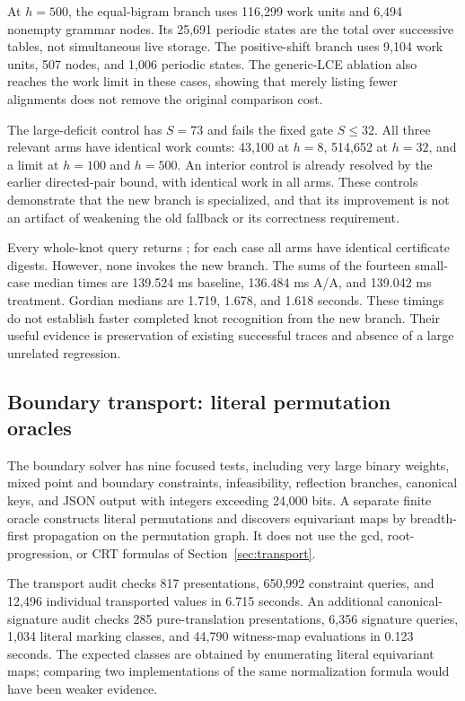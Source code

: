 \documentclass[11pt]{article}
\theoremstyle{definition}
\theoremstyle{remark}
\newcommand{\code}[1]{\texttt{\detokenize{#1}}}
\begin{document}
At $h=500$, the equal-bigram branch uses 116,299 work units and 6,494
nonempty grammar nodes. Its 25,691 periodic states are the total over
successive tables, not simultaneous live storage. The positive-shift branch
uses 9,104 work units, 507 nodes, and 1,006 periodic states. The generic-LCE
ablation also reaches the work limit in these cases, showing that merely
listing fewer alignments does not remove the original comparison cost.

The large-deficit control has $S=73$ and fails the fixed gate $S\le32$.
All three relevant arms have identical work counts: 43,100 at $h=8$,
514,652 at $h=32$, and a limit at $h=100$ and $h=500$. An interior control
is already resolved by the earlier directed-pair bound, with identical
work in all arms. These controls demonstrate that the new branch is
specialized, and that its improvement is not an artifact of weakening
the old fallback or its correctness requirement.

Every whole-knot query returns \code{UNKNOT}; for each case all arms have
identical certificate digests. However, none invokes the new branch.
The sums of the fourteen small-case median times are 139.524 ms baseline,
136.484 ms A/A, and 139.042 ms treatment. Gordian medians are 1.719, 1.678,
and 1.618 seconds. These timings do not establish faster completed knot
recognition from the new branch. Their useful evidence is preservation of
existing successful traces and absence of a large unrelated regression.

\subsection{Boundary transport: literal permutation oracles}

The boundary solver has nine focused tests, including very large binary
weights, mixed point and boundary constraints, infeasibility, reflection
branches, canonical keys, and JSON output with integers exceeding
24,000 bits. A separate
finite oracle constructs literal permutations and discovers equivariant
maps by breadth-first propagation on the permutation graph. It does not
use the gcd, root-progression, or CRT formulas of
Section~\ref{sec:transport}.

The transport audit checks 817 presentations, 650,992 constraint queries,
and 12,496 individual transported values in 6.715 seconds. An additional
canonical-signature audit checks 285 pure-translation presentations,
6,356 signature queries, 1,034 literal marking classes, and 44,790
witness-map evaluations in 0.123 seconds. The expected classes are obtained
by enumerating literal equivariant maps; comparing two implementations of
the same normalization formula would have been weaker evidence.
\end{document}

